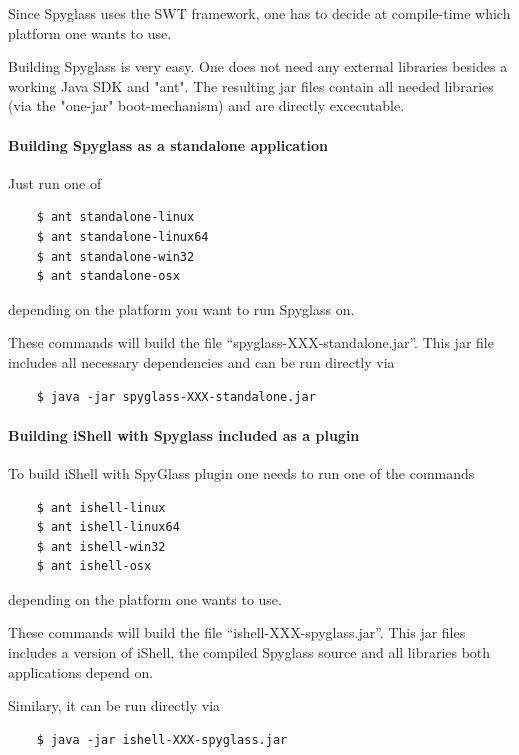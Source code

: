 Since Spyglass uses the SWT framework, one has to
decide at compile-time which platform one wants to use.

Building Spyglass is very easy. One does not need any external
libraries besides a working Java SDK and "ant".
The resulting jar files contain all needed libraries (via the
"one-jar" boot-mechanism) and are directly excecutable.


\paragraph{Building Spyglass as a standalone application}

Just run one of

\begin{verbatim}
    $ ant standalone-linux
    $ ant standalone-linux64
    $ ant standalone-win32
    $ ant standalone-osx
\end{verbatim}

depending on the platform you want to run Spyglass on.

These commands will build the file ``spyglass-XXX-standalone.jar''.
This jar file includes all necessary dependencies and can be run directly via

\begin{verbatim}
    $ java -jar spyglass-XXX-standalone.jar
\end{verbatim}

\paragraph{Building iShell with Spyglass included as a plugin}

To build iShell with SpyGlass plugin one needs to run one of the commands

\begin{verbatim}
    $ ant ishell-linux
    $ ant ishell-linux64
    $ ant ishell-win32
    $ ant ishell-osx
\end{verbatim}

depending on the platform one wants to use.

These commands will build the file ``ishell-XXX-spyglass.jar''.
This jar files includes a version of iShell, the compiled Spyglass source
and all libraries both applications depend on.

Similary, it can be run directly via

\begin{verbatim}
    $ java -jar ishell-XXX-spyglass.jar
\end{verbatim}

